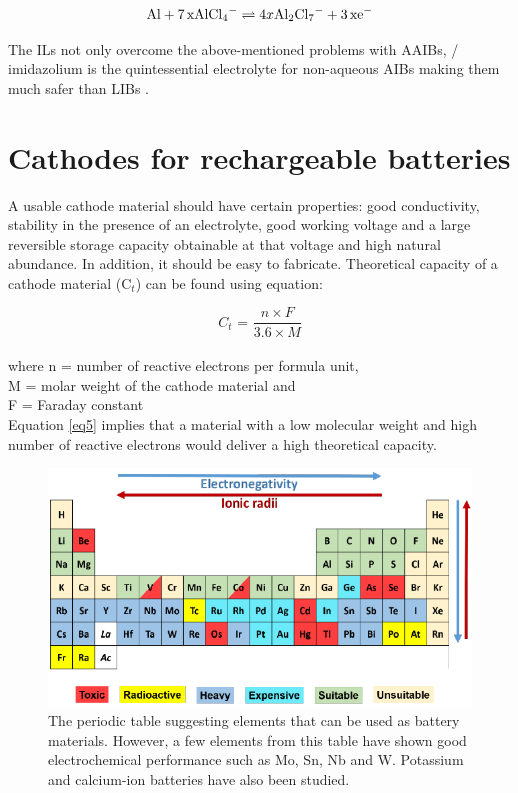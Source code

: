 \begin{align}
        \ce{Al + 7xAlCl4^{-}} \rightleftharpoons 4x\ce{Al2Cl7^{-} + 3xe-}
\end{align}

The ILs not only overcome the above-mentioned problems with AAIBs, / imidazolium is the quintessential electrolyte for non-aqueous AIBs making them much safer than LIBs \cite{jayaprakash_rechargeable_2011, lin_ultrafast_2015,wang_new_2013-1,rani_fluorinated_2013}. 

\section{Cathodes for rechargeable batteries}
A usable cathode material should have certain properties: good conductivity, stability in the presence of an electrolyte, good working voltage and a large reversible storage capacity obtainable at that voltage and high natural abundance. In addition, it should be easy to fabricate. Theoretical capacity of a cathode material (C$_{t}$) can be found using equation:

\begin{equation} \label{eq5}
   C_{t} \text{ = } \frac{n \times F}{3.6 \times M}
\end{equation}\\
where n = number of reactive electrons per formula unit,\\
M = molar weight of the cathode material and\\
F = Faraday constant\\
Equation \ref{eq5} implies that a material with a low molecular weight and high number of reactive electrons would deliver a high theoretical capacity.

\begin{figure}[h!]
\centering
\includegraphics[width=\textwidth]{Figures/chap1fig/pertab.pdf}
\caption{The periodic table suggesting elements that can be used as battery materials. However, a few elements from this table have shown good electrochemical performance such as Mo, Sn, Nb and W. Potassium and calcium-ion batteries have also been studied.}
\label{Figures/chap1fig:pertab}
\end{figure}


